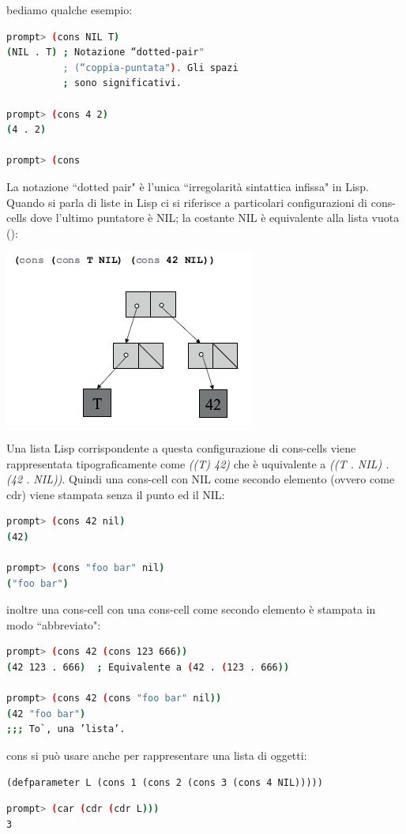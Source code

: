 \documentclass[a4paper,12pt, oneside]{book}
\begin{document}
bediamo qualche esempio:
\begin{shaded}
\begin{lstlisting}[language=bash]
prompt> (cons NIL T)
(NIL . T) ; Notazione “dotted-pair"
          ; (“coppia-puntata"). Gli spazi
          ; sono significativi.
          
prompt> (cons 4 2)
(4 . 2)

prompt> (cons
\end{lstlisting}
\end{shaded}
La notazione “dotted pair" è l’unica “irregolarità sintattica infissa" in Lisp.		
\\
Quando si parla di liste in Lisp ci si riferisce a particolari configurazioni di cons-cells dove l’ultimo puntatore è NIL; la costante NIL è equivalente alla lista vuota ():
\begin{center}
\includegraphics[scale=0.7]{img/cons3.png}
\end{center}
Una lista Lisp corrispondente a questa configurazione di cons-cells viene rappresentata tipograficamente come \textit{((T) 42)} che è uquivalente a \textit{((T . NIL) . (42 . NIL))}. Quindi una cons-cell con NIL come secondo
elemento (ovvero come cdr) viene stampata senza il punto ed il NIL:
\begin{shaded}
\begin{lstlisting}[language=bash]
prompt> (cons 42 nil)
(42)

prompt> (cons "foo bar" nil)
("foo bar")
\end{lstlisting}
\end{shaded}
inoltre una cons-cell con una cons-cell come secondo elemento è stampata in modo “abbreviato":
\begin{shaded}
\begin{lstlisting}[language=bash]
prompt> (cons 42 (cons 123 666))
(42 123 . 666)  ; Equivalente a (42 . (123 . 666))

prompt> (cons 42 (cons "foo bar" nil))
(42 "foo bar")
;;; To`, una ’lista’.
\end{lstlisting}
\end{shaded}
cons si può usare anche per rappresentare una lista di oggetti:
\begin{verbatim}
(defparameter L (cons 1 (cons 2 (cons 3 (cons 4 NIL)))))
\end{verbatim}
\begin{shaded}
\begin{lstlisting}[language=bash]
prompt> (car (cdr (cdr L)))
3
\end{lstlisting}
\end{shaded}
\end{document}
